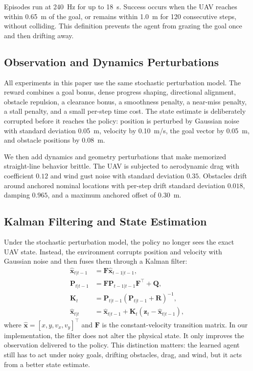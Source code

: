 \documentclass[runningheads]{llncs}
\begin{document}
Episodes run at \SI{240}{Hz} for up to \SI{18}{s}. Success occurs when the UAV reaches within \SI{0.65}{m} of the goal, or remains within \SI{1.0}{m} for 120 consecutive steps, without colliding. This definition prevents the agent from grazing the goal once and then drifting away.

\subsection{Observation and Dynamics Perturbations}
All experiments in this paper use the same stochastic perturbation model. The reward combines a goal bonus, dense progress shaping, directional alignment, obstacle repulsion, a clearance bonus, a smoothness penalty, a near-miss penalty, a stall penalty, and a small per-step time cost. The state estimate is deliberately corrupted before it reaches the policy: position is perturbed by Gaussian noise with standard deviation \SI{0.05}{m}, velocity by \SI{0.10}{m/s}, the goal vector by \SI{0.05}{m}, and obstacle positions by \SI{0.08}{m}.

We then add dynamics and geometry perturbations that make memorized straight-line behavior brittle. The UAV is subjected to aerodynamic drag with coefficient $0.12$ and wind gust noise with standard deviation $0.35$. Obstacles drift around anchored nominal locations with per-step drift standard deviation $0.018$, damping $0.965$, and a maximum anchored offset of \SI{0.30}{m}.

\subsection{Kalman Filtering and State Estimation}
Under the stochastic perturbation model, the policy no longer sees the exact UAV state. Instead, the environment corrupts position and velocity with Gaussian noise and then fuses them through a Kalman filter:
\begin{align}
\hat{\mathbf{x}}_{t|t-1} &= \mathbf{F}\hat{\mathbf{x}}_{t-1|t-1}, \\
\mathbf{P}_{t|t-1} &= \mathbf{F}\mathbf{P}_{t-1|t-1}\mathbf{F}^\top + \mathbf{Q}, \\
\mathbf{K}_t &= \mathbf{P}_{t|t-1}\left(\mathbf{P}_{t|t-1} + \mathbf{R}\right)^{-1}, \\
\hat{\mathbf{x}}_{t|t} &= \hat{\mathbf{x}}_{t|t-1} + \mathbf{K}_t \left(\mathbf{z}_t - \hat{\mathbf{x}}_{t|t-1}\right),
\end{align}
where $\hat{\mathbf{x}} = [x, y, v_x, v_y]^\top$ and $\mathbf{F}$ is the constant-velocity transition matrix. In our implementation, the filter does not alter the physical state. It only improves the observation delivered to the policy. This distinction matters: the learned agent still has to act under noisy goals, drifting obstacles, drag, and wind, but it acts from a better state estimate.
\end{document}
